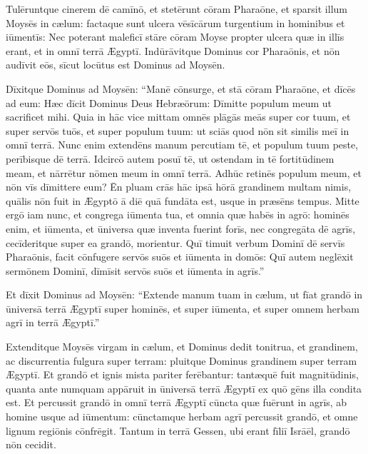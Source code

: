 Tulēruntque
cinerem dē camīnō, et stetērunt cōram Pharaōne, et sparsit
illum Moysēs in cælum: factaque sunt ulcera vēsīcārum
turgentium in hominibus et iūmentīs:  Nec poterant
maleficī stāre cōram Moyse propter ulcera quæ in illīs
erant, et in omnī terrā Ægyptī.  Indūrāvitque Dominus cor Pharaōnis, et nōn audīvit eōs, sīcut
locūtus est Dominus ad Moysēn.

Dīxitque Dominus ad Moysēn: ``Manē
cōnsurge, et stā cōram Pharaōne, et dīcēs ad eum:
Hæc dīcit Dominus Deus Hebræōrum: Dīmitte populum meum ut sacrificet
mihi.  Quia in hāc vice mittam omnēs 
plāgās meās super
cor tuum, et super servōs tuōs, et super populum tuum: ut sciās quod nōn
sit similis meī in omnī terrā.  Nunc enim extendēns manum percutiam tē,
et populum tuum peste, perībisque dē terrā.  Idcircō autem posuī tē, ut ostendam in tē fortitūdinem
meam, et nārrētur nōmen meum in omnī terrā.  Adhūc retinēs populum meum,
et nōn vīs dīmittere eum?  Ēn pluam crās hāc ipsā hōrā
grandinem multam nimis, quālis nōn fuit in Ægyptō ā diē quā
fundāta est, usque in præsēns tempus.  Mitte ergō iam nunc, et
congrega iūmenta tua, et omnia quæ habēs in agrō: hominēs
enim, et iūmenta, et ūniversa quæ inventa fuerint forīs, nec
congregāta dē
agrīs, cecīderitque super ea grandō, morientur.  Quī
timuit verbum Dominī dē servīs Pharaōnis, facit cōnfugere
servōs suōs et iūmenta in domōs: Quī autem neglēxit sermōnem Dominī,
dīmīsit servōs suōs et iūmenta in agrīs.''

Et dīxit Dominus ad Moysēn: ``Extende manum tuam in cælum, ut fīat grandō in ūniversā terrā Ægyptī super
hominēs, et super iūmenta, et super omnem herbam agrī in terrā Ægyptī.''

Extenditque Moysēs virgam in cælum, et Dominus dedit
tonitrua, et grandinem, ac discurrentia
fulgura super terram: pluitque Dominus grandinem super
terram Ægyptī.  Et grandō et ignis mista
pariter ferēbantur: tantæquē fuit
magnitūdinis, quanta ante numquam appāruit in ūniversā
terrā Ægyptī ex quō gēns illa condita est.  Et percussit
grandō in omnī terrā Ægyptī cūncta quæ fuērunt in agrīs, ab homine usque ad
iūmentum: cūnctamque herbam agrī percussit grandō, et omne lignum regiōnis
cōnfrēgit.  Tantum in terrā Gessen, ubi erant fīliī
Isrāēl, grandō nōn cecidit.  

